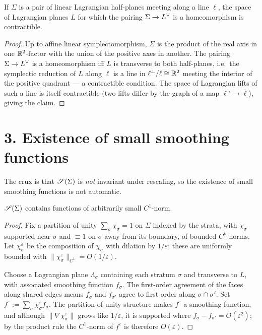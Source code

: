 \documentclass[11pt]{article}
\begin{document}
\begin{qeightlemma}\label{lem:edge}
If $\Sigma$ is a pair of linear Lagrangian half-planes meeting along a line
$\ell$, the space of Lagrangian planes $L$ for which the pairing
$\Sigma\to L^{\vee}$ is a homeomorphism is contractible.
\end{qeightlemma}

\begin{proof}
Up to affine linear symplectomorphism, $\Sigma$ is the product of the real axis
in one $\mathbb{R}^2$-factor with the union of the positive axes in another. The pairing
$\Sigma\to L^{\vee}$ is a homeomorphism iff $L$ is transverse to both half-planes,
i.e.\ the symplectic reduction of $L$ along $\ell$ is a line in $\ell^\perp/\ell\cong\mathbb{R}^2$
meeting the interior of the positive quadrant — a contractible condition. The
space of Lagrangian lifts of such a line is itself contractible (two lifts differ
by the graph of a map $\ell'\to\ell$), giving the claim.
\end{proof}

\section*{3. Existence of small smoothing functions}

The crux is that $\mathscr S(\Sigma)$ is \emph{not} invariant under rescaling, so the
existence of small smoothing functions is not automatic.

\begin{qeightlemma}\label{lem:small}
$\mathscr S(\Sigma)$ contains functions of arbitrarily small $C^1$-norm.
\end{qeightlemma}

\begin{proof}
Fix a partition of unity $\sum_\sigma \chi_\sigma=1$ on $\Sigma$ indexed by the
strata, with $\chi_\sigma$ supported near $\sigma$ and $\equiv1$ on $\sigma$ away
from its boundary, of bounded $C^k$ norms. Let $\chi_\sigma^\varepsilon$ be the
composition of $\chi_\sigma$ with dilation by $1/\varepsilon$; these are
uniformly bounded with $\|\chi_\sigma^\varepsilon\|_{C^1}=O(1/\varepsilon)$.

Choose a Lagrangian plane $\Lambda_\sigma$ containing each stratum $\sigma$ and
transverse to $L$, with associated smoothing function $f_\sigma$. The first-order
agreement of the faces along shared edges means $f_\sigma$ and $f_{\sigma'}$ agree
to first order along $\sigma\cap\sigma'$. Set $f^\varepsilon:=\sum_\sigma
\chi_\sigma^\varepsilon f_\sigma$. The partition-of-unity structure makes
$f^\varepsilon$ a smoothing function, and although $\|\nabla\chi_\sigma^\varepsilon\|$
grows like $1/\varepsilon$, it is supported where $f_\sigma-f_{\sigma'}=O(\varepsilon^2)$;
by the product rule the $C^1$-norm of $f^\varepsilon$ is therefore $O(\varepsilon)$.
\end{proof}
\end{document}
